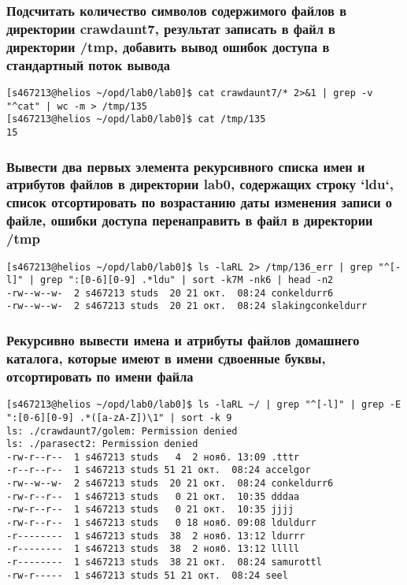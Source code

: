 \subsubsection*{Подсчитать количество символов содержимого файлов в директории crawdaunt7, результат записать в файл в директории /tmp, добавить вывод ошибок доступа в стандартный поток вывода}
\begin{verbatim}
[s467213@helios ~/opd/lab0/lab0]$ cat crawdaunt7/* 2>&1 | grep -v "^cat" | wc -m > /tmp/135
[s467213@helios ~/opd/lab0/lab0]$ cat /tmp/135
15
\end{verbatim}

\subsubsection*{Вывести два первых элемента рекурсивного списка имен и атрибутов файлов в директории lab0, содержащих строку `ldu`, список отсортировать по возрастанию даты изменения записи о файле, ошибки доступа перенаправить в файл в директории /tmp}
\begin{verbatim}
[s467213@helios ~/opd/lab0/lab0]$ ls -laRL 2> /tmp/136_err | grep "^[-l]" | grep ":[0-6][0-9] .*ldu" | sort -k7M -nk6 | head -n2
-rw--w--w-  2 s467213 studs  20 21 окт.  08:24 conkeldurr6
-rw--w--w-  2 s467213 studs  20 21 окт.  08:24 slakingconkeldurr
\end{verbatim}

\subsubsection*{Рекурсивно вывести имена и атрибуты файлов домашнего каталога, которые имеют в имени сдвоенные буквы, отсортировать по имени файла}
\begin{verbatim}
[s467213@helios ~/opd/lab0/lab0]$ ls -laRL ~/ | grep "^[-l]" | grep -E ":[0-6][0-9] .*([a-zA-Z])\1" | sort -k 9
ls: ./crawdaunt7/golem: Permission denied
ls: ./parasect2: Permission denied
-rw-r--r--  1 s467213 studs   4  2 нояб. 13:09 .tttr
-r--r--r--  1 s467213 studs 51 21 окт.  08:24 accelgor
-rw--w--w-  2 s467213 studs  20 21 окт.  08:24 conkeldurr6
-rw-r--r--  1 s467213 studs   0 21 окт.  10:35 dddaa
-rw-r--r--  1 s467213 studs   0 21 окт.  10:35 jjjj
-rw-r--r--  1 s467213 studs   0 18 нояб. 09:08 lduldurr
-r--------  1 s467213 studs  38  2 нояб. 13:12 ldurrr
-r--------  1 s467213 studs  38  2 нояб. 13:12 lllll
-r--------  1 s467213 studs  38 21 окт.  08:24 samurottl
-rw-r-----  1 s467213 studs 51 21 окт.  08:24 seel
\end{verbatim}